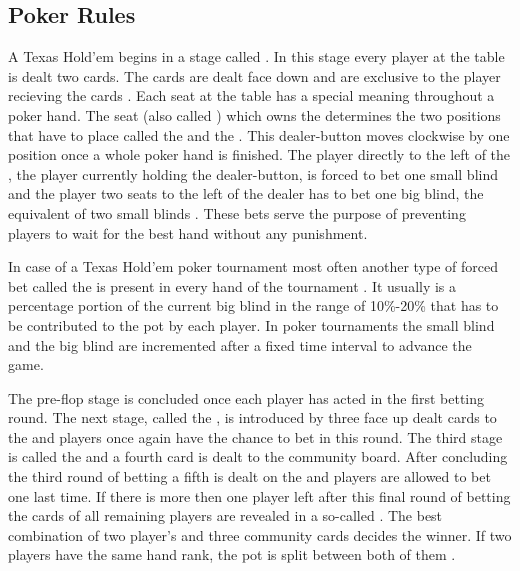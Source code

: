 \subsection{Poker Rules}
A Texas Hold'em  begins in a stage called . In this stage every player at the table is dealt two cards. The cards are dealt face down and are exclusive to the player recieving the cards \cite{billings_phd}. Each seat at the table has a special meaning throughout a poker hand. The seat (also called ) which owns the  determines the two positions that have to place   called the  and the . This dealer-button moves clockwise by one position once a whole poker hand is finished. The player directly to the left of the , the player currently holding the dealer-button, is forced to bet one small blind and the player two seats to the left of the dealer has to bet one big blind, the equivalent of two small blinds \cite{master_nuno}. These bets serve the purpose of preventing players to wait for the best hand without any punishment. \par In case of a Texas Hold'em poker tournament most often another type of forced bet called the  is present in every hand of the tournament \cite{poker_dummies}. It usually is a percentage portion of the current big blind in the range of 10\%-20\% that has to be contributed to the pot by each player.
In poker tournaments the small blind and the big blind are incremented after a fixed time interval to advance the game.  \par
The pre-flop stage is concluded once each player has acted in the first betting round. The next stage, called the , is introduced by three face up dealt cards to the  and players once again have the chance to bet in this round. The third stage is called the  and a fourth card is dealt to the community board. After concluding the third round of betting a fifth  is dealt on the  and players are allowed to bet one last time. If there is more then one player left after this final round of betting the cards of all remaining players are revealed in a so-called . The best combination of two player's  and three community cards decides the winner. If two players have the same hand rank, the pot is split between both of them \cite{billings_phd}.
